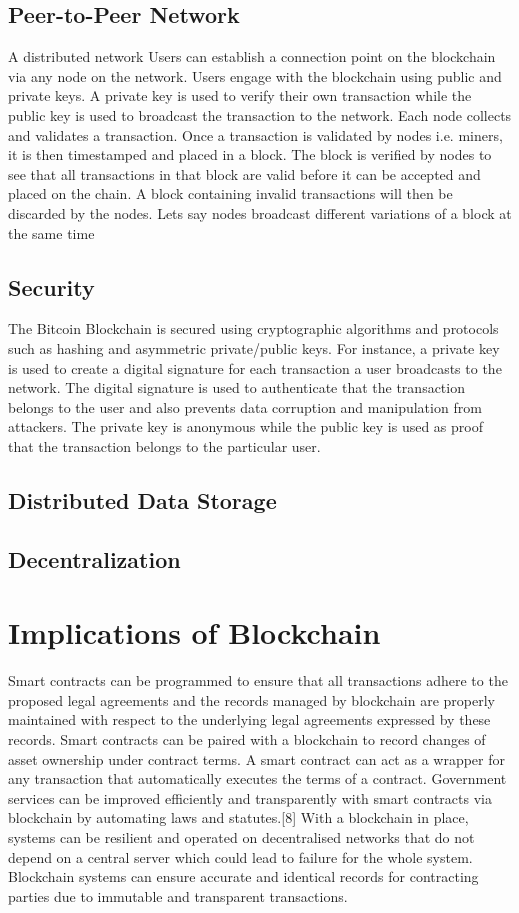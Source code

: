 \documentclass[report]{IEEEtran}
\begin{document}
\subsection{Peer-to-Peer Network}
A distributed network  Users can establish a connection point on the blockchain via any node on the network. Users engage with the blockchain using public and private keys. A private key is used to verify their own transaction while the public key is used to broadcast the transaction to the network. Each node collects and validates a transaction. Once a transaction is validated by nodes i.e. miners, it is then timestamped and placed in a block. The block is verified by nodes to see that all transactions in that block are valid before it can be accepted and placed on the chain. A block containing invalid transactions will then be discarded by the nodes. Lets say nodes broadcast different variations of a block at the same time
\subsection{Security}
The Bitcoin Blockchain is secured using cryptographic algorithms and protocols such as hashing and asymmetric private/public keys. For instance, a private key is used to create a digital signature for each transaction a user broadcasts to the network. The digital signature is used to authenticate that the transaction belongs to the user and also prevents data corruption and manipulation from attackers. The private key is anonymous while the public key is used as proof that the transaction belongs to the particular user. 
\subsection{Distributed Data Storage}
\subsection{Decentralization}

\section{Implications of Blockchain}
Smart contracts can be programmed to ensure that all transactions adhere to the proposed legal agreements and the records managed by blockchain are properly maintained with respect to the underlying legal agreements expressed by these records. Smart contracts can be paired with a blockchain to record changes of asset ownership under contract terms. A smart contract can act as a wrapper for any transaction that automatically executes the terms of a contract. Government services can be improved efficiently and transparently with smart contracts via blockchain by automating laws and statutes.[8] With a blockchain in place, systems can be resilient and operated on decentralised networks that do not depend on a central server which could lead to failure for the whole system. Blockchain systems can ensure accurate and identical records for contracting parties due to immutable and transparent transactions. 
\end{document}
